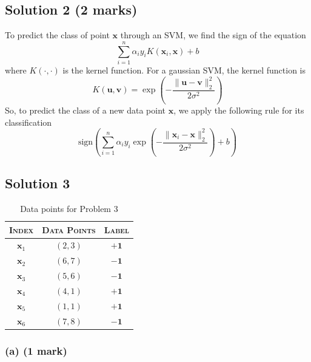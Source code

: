 \documentclass[12pt]{article}
\begin{document}
    \subsection*{Solution 2 (2 marks)}
    To predict the class of point $\mathbf{x}$ through an SVM, we find the sign of the equation
    \begin{equation}
        \sum_{i=1}^{n} \alpha_{i} y_{i} K(\mathbf{x}_{i}, \mathbf{x}) + b
    \end{equation}
    where $K(\cdot, \cdot)$ is the kernel function. For a gaussian SVM, the kernel
    function is
    \begin{equation}
        K(\mathbf{u}, \mathbf{v}) = \exp\left( - \frac{\lVert \mathbf{u} - \mathbf{v} \rVert_{2}^{2}}{2 \sigma^{2}} \right)
    \end{equation}
    So, to predict the class of a new data point $\mathbf{x}$, we apply the following rule for its classification
    \begin{equation}
        \text{sign} \left( \sum_{i=1}^{n} \alpha_{i} y_{i} \exp\left( - \frac{\lVert \mathbf{x}_{i} - \mathbf{x} \rVert_{2}^{2}}{2 \sigma^{2}} \right) + b \right)
    \end{equation}

    \subsection*{Solution 3}
    \begin{table}[htbp]
        \centering
        \begin{tabular}{cc|c}
            \textsc{Index} & \textsc{Data Points} & \textsc{Label} \\
            \hline
            $\mathbf{x}_{1}$ & $(2, 3)$ & $\mathbf{+1}$ \\
            $\mathbf{x}_{2}$ & $(6, 7)$ & $\mathbf{-1}$ \\
            $\mathbf{x}_{3}$ & $(5, 6)$ & $\mathbf{-1}$ \\
            $\mathbf{x}_{4}$ & $(4, 1)$ & $\mathbf{+1}$ \\
            $\mathbf{x}_{5}$ & $(1, 1)$ & $\mathbf{+1}$ \\
            $\mathbf{x}_{6}$ & $(7, 8)$ & $\mathbf{-1}$ \\
        \end{tabular}
        \caption{Data points for Problem 3}
        \label{tab:prob3}
    \end{table}

    \subsubsection*{(a) (1 mark)}
\end{document}
